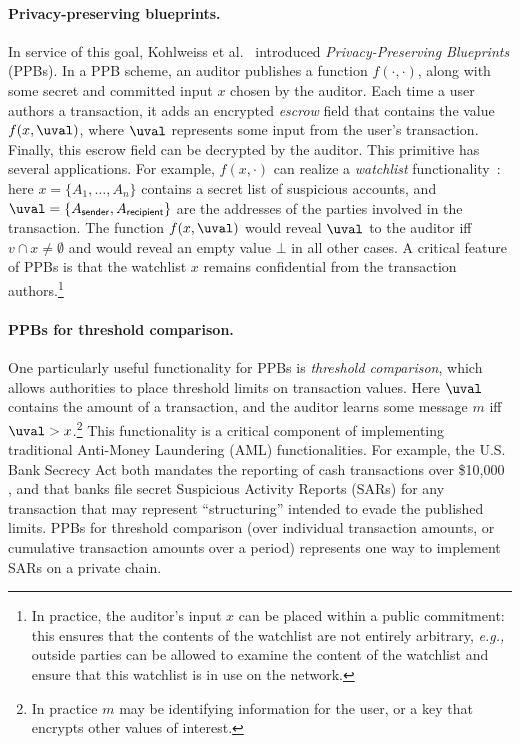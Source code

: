 \paragraph{Privacy-preserving blueprints.}
In service of this goal, Kohlweiss et al.\ \cite{EC:KohLysNgu23} introduced \emph{Privacy-Preserving Blueprints} (PPBs).
In a PPB scheme, an auditor publishes a function $f(\cdot, \cdot)$, along with some secret and committed input $x$ chosen by the auditor.
Each time a user authors a transaction, it adds an encrypted \emph{escrow} field that contains the value $f(x, \uval)$, where $\uval$ represents some input from the user's transaction.
Finally, this escrow field can be decrypted by the auditor.
This primitive has several applications.
For example,  $f(x, \cdot)$ can realize a \emph{watchlist} functionality~\cite{EC:KohLysNgu23,EPRINT:GKLS24}: here $x = \{A_1, \dots, A_n\}$ contains a secret list of suspicious accounts, and $\uval = \{A_{\sf sender}, A_{\sf recipient}\}$ are the addresses of the parties involved in the transaction.
The function $f(x, \uval)$ would reveal $\uval$ to the auditor iff $v \cap x \ne \emptyset$ and would reveal an empty value $\bot$ in all other cases.
A critical feature of PPBs is that the watchlist $x$ remains confidential from the transaction authors.\footnote{In practice, the auditor's input $x$ can be placed within a public commitment: this ensures that the contents of the watchlist are not entirely arbitrary, \emph{e.g.,} outside parties can be allowed to examine the content of the watchlist and ensure that this watchlist is in use on the network.}

\paragraph{PPBs for threshold comparison.}
One particularly useful functionality for PPBs is  \emph{threshold comparison}, which allows authorities to place threshold limits on transaction values.
Here $\uval$ contains the amount of a transaction, and the auditor learns some message $m$ iff $\uval > x$.\footnote{In practice $m$ may be identifying information for the user, or a key that encrypts other values of interest.}
This functionality is a critical component of implementing traditional Anti-Money Laundering (AML) functionalities.
For example, the U.S. Bank Secrecy Act both mandates the reporting of cash transactions over \$10,000 \cite{meltzer1991keeping}, and that banks file secret Suspicious Activity Reports (SARs) for any transaction  that may represent ``structuring'' intended to evade the published limits.
PPBs for threshold comparison (over individual transaction amounts, or cumulative transaction amounts over a period) represents one way to implement SARs on a private chain.

